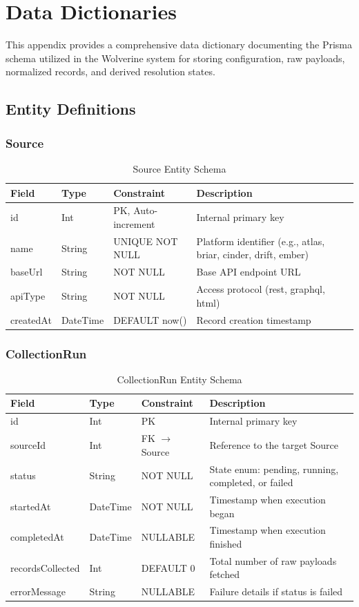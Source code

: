 \chapter{Data Dictionaries}
\label{app:data-dictionaries}

This appendix provides a comprehensive data dictionary documenting the Prisma schema utilized in the Wolverine system for storing configuration, raw payloads, normalized records, and derived resolution states.

\section{Entity Definitions}

\subsection{Source}
\begin{table}[htpb]
\centering
\begin{tabular}{lllp{6cm}}
\toprule
\textbf{Field} & \textbf{Type} & \textbf{Constraint} & \textbf{Description} \\
\midrule
id & Int & PK, Auto-increment & Internal primary key \\
name & String & UNIQUE NOT NULL & Platform identifier (e.g., atlas, briar, cinder, drift, ember) \\
baseUrl & String & NOT NULL & Base API endpoint URL \\
apiType & String & NOT NULL & Access protocol (rest, graphql, html) \\
createdAt & DateTime & DEFAULT now() & Record creation timestamp \\
\bottomrule
\end{tabular}
\caption{Source Entity Schema}
\end{table}

\subsection{CollectionRun}
\begin{table}[htpb]
\centering
\begin{tabular}{lllp{6cm}}
\toprule
\textbf{Field} & \textbf{Type} & \textbf{Constraint} & \textbf{Description} \\
\midrule
id & Int & PK & Internal primary key \\
sourceId & Int & FK $\rightarrow$ Source & Reference to the target Source \\
status & String & NOT NULL & State enum: pending, running, completed, or failed \\
startedAt & DateTime & NOT NULL & Timestamp when execution began \\
completedAt & DateTime & NULLABLE & Timestamp when execution finished \\
recordsCollected & Int & DEFAULT 0 & Total number of raw payloads fetched \\
errorMessage & String & NULLABLE & Failure details if status is failed \\
\bottomrule
\end{tabular}
\caption{CollectionRun Entity Schema}
\end{table}

